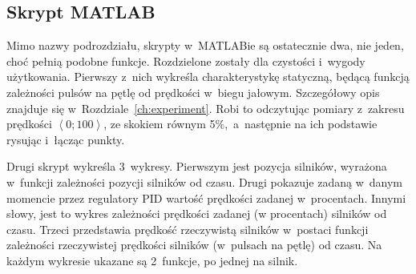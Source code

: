 \subsection*{Skrypt MATLAB}
Mimo nazwy podrozdziału, skrypty w~MATLABie są ostatecznie dwa, nie jeden, choć pełnią podobne funkcje. Rozdzielone zostały dla czystości i~wygody użytkowania. Pierwszy z~nich wykreśla charakterystykę statyczną, będącą funkcją zależności pulsów na pętlę od prędkości w~biegu jałowym. Szczegółowy opis znajduje się w~Rozdziale~\ref{ch:experiment}. Robi to odczytując pomiary z~zakresu prędkości $\left<0; 100\right>$, ze skokiem równym 5\%,~a~następnie na ich podstawie rysując i~łącząc punkty.

Drugi skrypt wykreśla 3~wykresy. Pierwszym jest pozycja silników, wyrażona w~funkcji zależności pozycji silników od czasu. Drugi pokazuje zadaną w~danym momencie przez regulatory PID wartość prędkości zadanej w~procentach. Innymi słowy, jest to wykres zależności prędkości zadanej (w procentach) silników od czasu. Trzeci przedstawia prędkość rzeczywistą silników w~postaci funkcji zależności rzeczywistej prędkości silników (w~pulsach na pętlę) od czasu. Na każdym wykresie ukazane są 2~funkcje, po jednej na silnik.